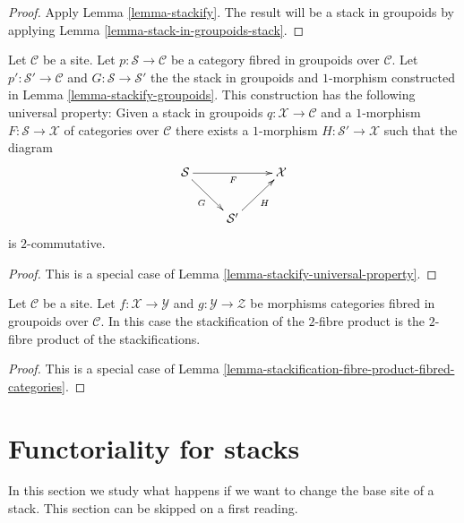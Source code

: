 \begin{proof}
Apply Lemma \ref{lemma-stackify}. The result will be a
stack in groupoids by applying Lemma \ref{lemma-stack-in-groupoids-stack}.
\end{proof}

\begin{lemma}
\label{lemma-stackify-groupoids-universal-property}
Let $\mathcal{C}$ be a site.
Let $p : \mathcal{S} \to \mathcal{C}$ be a category fibred in groupoids
over $\mathcal{C}$. Let $p' : \mathcal{S}' \to \mathcal{C}$ and
$G : \mathcal{S} \to \mathcal{S}'$
the the stack in groupoids and $1$-morphism constructed in
Lemma \ref{lemma-stackify-groupoids}.
This construction has the following universal property: Given a stack
in groupoids $q : \mathcal{X} \to \mathcal{C}$ and a $1$-morphism
$F : \mathcal{S} \to \mathcal{X}$ of categories over $\mathcal{C}$
there exists a $1$-morphism $H : \mathcal{S}' \to \mathcal{X}$
such that the diagram
$$
\xymatrix{
\mathcal{S} \ar[rr]_F \ar[rd]_G & & \mathcal{X} \\
& \mathcal{S}' \ar[ru]_H
}
$$
is $2$-commutative.
\end{lemma}

\begin{proof}
This is a special case of
Lemma \ref{lemma-stackify-universal-property}.
\end{proof}

\begin{lemma}
\label{lemma-stackification-fibre-product-categories-fibred-in-groupoids}
Let $\mathcal{C}$ be a site.
Let $f : \mathcal{X} \to \mathcal{Y}$ and $g : \mathcal{Y} \to \mathcal{Z}$
be morphisms categories fibred in groupoids over $\mathcal{C}$.
In this case the stackification of the $2$-fibre product is the $2$-fibre
product of the stackifications.
\end{lemma}

\begin{proof}
This is a special case of
Lemma \ref{lemma-stackification-fibre-product-fibred-categories}.
\end{proof}




\section{Functoriality for stacks}
\label{section-inverse-image}

\noindent
In this section we study what happens if we want to change the base site
of a stack. This section can be skipped on a first reading.

